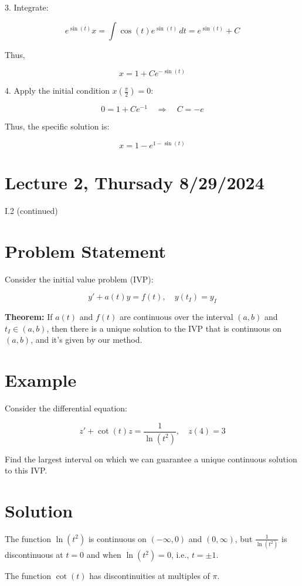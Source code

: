 \documentclass{article}
\begin{document}
3. Integrate:

\[
e^{\sin(t)} x = \int \cos(t) e^{\sin(t)} \, dt = e^{\sin(t)} + C
\]

Thus,

\[
x = 1 + C e^{-\sin(t)}
\]

4. Apply the initial condition \( x\left(\frac{\pi}{2}\right) = 0 \):

\[
0 = 1 + C e^{-1} \quad \Rightarrow \quad C = -e
\]

Thus, the specific solution is:

\[
x = 1 - e^{1 - \sin(t)}
\]

\section*{Lecture 2, Thursady 8/29/2024}

I.2 (continued)

\section*{Problem Statement}

Consider the initial value problem (IVP):

\[
y' + a(t)y = f(t), \quad y(t_I) = y_I
\]

\textbf{Theorem:}  
If \( a(t) \) and \( f(t) \) are continuous over the interval \( (a, b) \) and \( t_I \in (a, b) \), then there is a unique solution to the IVP that is continuous on \( (a, b) \), and it's given by our method.

\section*{Example}

Consider the differential equation:

\[
z' + \cot(t)z = \frac{1}{\ln(t^2)}, \quad z(4) = 3
\]

Find the largest interval on which we can guarantee a unique continuous solution to this IVP.

\section*{Solution}

The function \( \ln(t^2) \) is continuous on \( (-\infty, 0) \) and \( (0, \infty) \), but \( \frac{1}{\ln(t^2)} \) is discontinuous at \( t = 0 \) and when \( \ln(t^2) = 0 \), i.e., \( t = \pm 1 \).

The function \( \cot(t) \) has discontinuities at multiples of \( \pi \).
\end{document}

